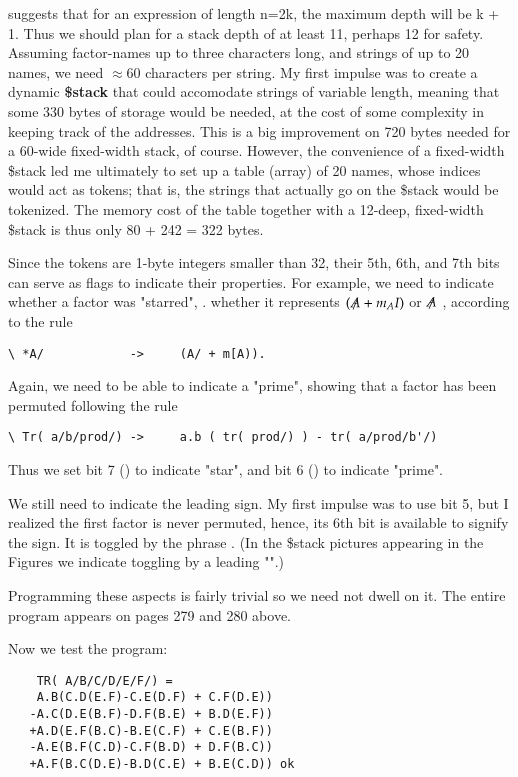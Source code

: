 suggests that for an expression of length n=2k, the maximum depth will be k + 1. Thus we should plan for a stack depth of at least 11, perhaps 12 for safety. Assuming factor-names up to three characters long, and strings of up to 20 names, we need $\approx$60 characters per string. My first impulse was to create a dynamic \textbf{\$stack} that could accomodate strings of variable length, meaning that some 330 bytes of storage would be needed, at the cost of some complexity in keeping track of the addresses. This is a big improvement on 720 bytes needed for a 60-wide fixed-width stack, of course. However, the convenience of a fixed-width \$stack led me ultimately to set up a table (array) of 20 names, whose indices would act as tokens; that is, the strings that actually go on the \$stack would be tokenized. The memory cost of the table together with a 12-deep, fixed-width \$stack is thus only 80 + 242 = 322 bytes.

Since the tokens are 1-byte integers smaller than 32, their 5th, 6th, and 7th bits can serve as flags to indicate their properties. For example, we need to indicate whether a factor was "starred", \ie. whether it represents $(\tr{A} + m_{A}I)$ or $\tr{A}$ , according to the rule

\begin{verbatim}
\ *A/            ->     (A/ + m[A)).
\end{verbatim}

Again, we need to be able to indicate a "prime", showing that a factor has been permuted following the rule

\begin{verbatim}
\ Tr( a/b/prod/) ->     a.b ( tr( prod/) ) - tr( a/prod/b'/)
\end{verbatim}

Thus we set bit 7 () to indicate "star", and bit 6 () to indicate "prime".

We still need to indicate the leading sign. My first impulse was to use bit 5, but I realized the first factor is never permuted, hence, its 6th bit is available to signify the sign. It is toggled by the phrase . (In the \$stack pictures appearing in the Figures we indicate toggling by a leading "\bc{\~}".)

Programming these aspects is fairly trivial so we need not dwell on it. The entire program appears on pages 279 and 280 above.

Now we test the program:

\begin{lstlisting}
    TR( A/B/C/D/E/F/) =
    A.B(C.D(E.F)-C.E(D.F) + C.F(D.E))
   -A.C(D.E(B.F)-D.F(B.E) + B.D(E.F))
   +A.D(E.F(B.C)-B.E(C.F) + C.E(B.F))
   -A.E(B.F(C.D)-C.F(B.D) + D.F(B.C))
   +A.F(B.C(D.E)-B.D(C.E) + B.E(C.D)) ok
\end{lstlisting}

